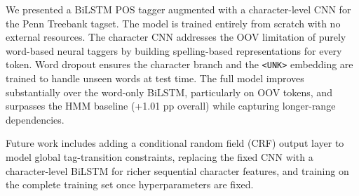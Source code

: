 \documentclass[11pt]{article}
\begin{document}
We presented a BiLSTM POS tagger augmented with a character-level CNN for the
Penn Treebank tagset.  The model is trained entirely from scratch with no
external resources.  The character CNN addresses the OOV limitation of
purely word-based neural taggers by building spelling-based representations
for every token.  Word dropout ensures the character branch and the
\texttt{<UNK>} embedding are trained to handle unseen words at test time.
The full model improves substantially over the word-only BiLSTM, particularly
on OOV tokens, and surpasses the HMM baseline (+1.01 pp overall) while capturing
longer-range dependencies.

Future work includes adding a conditional random field (CRF) output layer to
model global tag-transition constraints, replacing the fixed CNN with a
character-level BiLSTM for richer sequential character features, and training
on the complete training set once hyperparameters are fixed.



\end{document}
